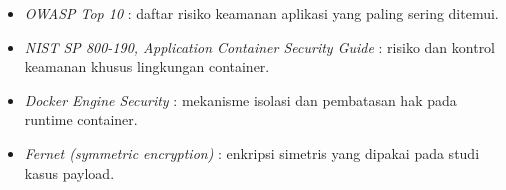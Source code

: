 \begin{itemize}
  \item \textit{OWASP Top 10} \cite{owasp-top10}: daftar risiko keamanan aplikasi yang paling sering ditemui.
  \item \textit{NIST SP 800-190, Application Container Security Guide} \cite{nist80190}: risiko dan kontrol keamanan khusus lingkungan container.
  \item \textit{Docker Engine Security} \cite{doc-docker-security}: mekanisme isolasi dan pembatasan hak pada runtime container.
  \item \textit{Fernet (symmetric encryption)} \cite{doc-fernet}: enkripsi simetris yang dipakai pada studi kasus payload.
\end{itemize}
